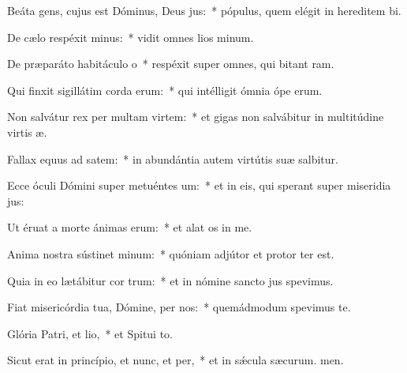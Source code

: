 \item Beáta gens, cujus est Dóminus, Deus jus:~* pópulus, quem elégit in hereditem bi.
\item De cælo respéxit minus:~* vidit omnes lios minum.
\item De præparáto habitáculo o~* respéxit super omnes, qui bitant ram.
\item Qui finxit sigillátim corda erum:~* qui intélligit ómnia ópe erum.
\item Non salvátur rex per multam virtem:~* et gigas non salvábitur in multitúdine virtis æ.
\item Fallax equus ad satem:~* in abundántia autem virtútis suæ  salbitur.
\item Ecce óculi Dómini super metuéntes um:~* et in eis, qui sperant super miseridia jus:
\item Ut éruat a morte ánimas erum:~* et alat os in me.
\item Anima nostra sústinet minum:~* quóniam adjútor et protor ter est.
\item Quia in eo lætábitur cor trum:~* et in nómine sancto jus spevimus.
\item Fiat misericórdia tua, Dómine, per nos:~* quemádmodum spevimus  te.
\item Glória Patri, et lio,~* et Spitui to.
\item Sicut erat in princípio, et nunc, et per,~* et in sǽcula sæcurum. men.
